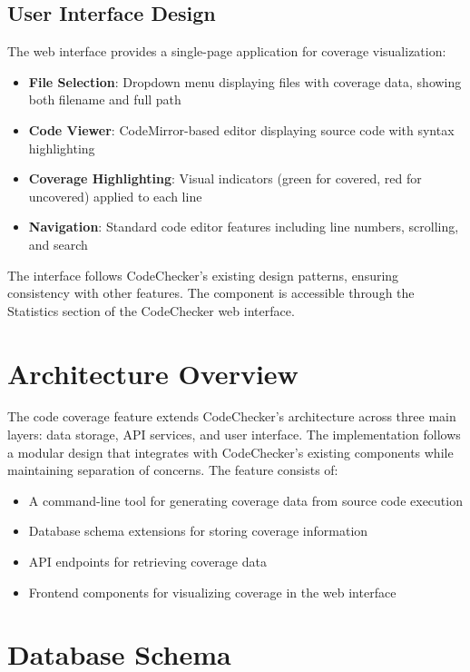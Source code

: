 \subsection{User Interface Design}

The web interface provides a single-page application for coverage visualization:

\begin{itemize}
    \item \textbf{File Selection}: Dropdown menu displaying files with coverage data, showing both filename and full path
    \item \textbf{Code Viewer}: CodeMirror-based editor displaying source code with syntax highlighting
    \item \textbf{Coverage Highlighting}: Visual indicators (green for covered, red for uncovered) applied to each line
    \item \textbf{Navigation}: Standard code editor features including line numbers, scrolling, and search
\end{itemize}

The interface follows CodeChecker's existing design patterns, ensuring consistency with other features. The component is accessible through the Statistics section of the CodeChecker web interface.

\section{Architecture Overview}

The code coverage feature extends CodeChecker's architecture across three main layers: data storage, API services, and user interface. The implementation follows a modular design that integrates with CodeChecker's existing components while maintaining separation of concerns. The feature consists of:

\begin{itemize}
    \item A command-line tool for generating coverage data from source code execution
    \item Database schema extensions for storing coverage information
    \item API endpoints for retrieving coverage data
    \item Frontend components for visualizing coverage in the web interface
\end{itemize}

\section{Database Schema}


